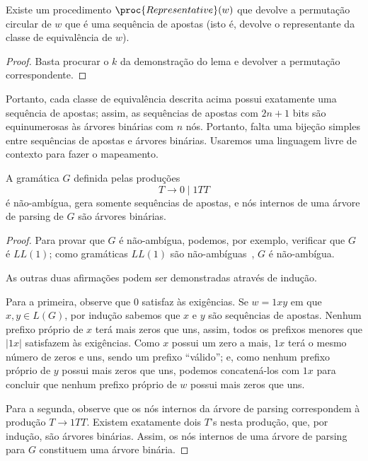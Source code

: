 \begin{corollary}
    Existe um procedimento $\proc{Representative}(w)$
    que devolve a permutação circular de $w$ que é uma sequência de apostas
    (isto é, devolve o representante da classe de equivalência de $w$).
\end{corollary}

\begin{proof}
    Basta procurar o $k$ da demonstração do lema
    e devolver a permutação correspondente.
\end{proof}

Portanto, cada classe de equivalência descrita acima
possui exatamente uma sequência de apostas;
assim, as sequências de apostas com $2n+1$ bits
são equinumerosas às árvores binárias com $n$ nós.
Portanto,
falta uma bijeção simples entre sequências de apostas e árvores binárias.
Usaremos uma linguagem livre de contexto para fazer o mapeamento.

\begin{lemma}
    A gramática $G$ definida pelas produções
    \begin{equation*}
        T \to 0 \mid 1TT
    \end{equation*}
    é não-ambígua, gera somente sequências de apostas,
    e nós internos de uma árvore de parsing de $G$
    são árvores binárias.
\end{lemma}

\begin{proof}
    Para provar que $G$ é não-ambígua,
    podemos, por exemplo, verificar que $G$ é $LL(1)$; %
    como gramáticas $LL(1)$ são não-ambíguas~\cite[p.~233]{AhoLamSethiUllman2006},
    $G$ é não-ambígua.

    As outras duas afirmações podem ser demonstradas através de indução.

    Para a primeira,
    observe que $0$ satisfaz às exigências.
    Se $w = 1xy$ em que $x, y \in L(G)$,
    por indução sabemos que $x$ e $y$ são sequências de apostas.
    Nenhum prefixo próprio de $x$ terá mais zeros que uns,
    assim, todos os prefixos menores que $|1x|$ satisfazem às exigências.
    Como $x$ possui um zero a mais, $1x$ terá o mesmo número de zeros e uns,
    sendo um prefixo ``válido'';
    e, como nenhum prefixo próprio de $y$ possui mais zeros que uns,
    podemos concatená-los com $1x$ para concluir que
    nenhum prefixo próprio de $w$ possui mais zeros que uns.

    Para a segunda,
    observe que os nós internos da árvore de parsing
    correspondem à produção $T \to 1TT$.
    Existem exatamente dois $T$'s nesta produção,
    que, por indução, são árvores binárias.
    Assim, os nós internos de uma árvore de parsing para $G$
    constituem uma árvore binária.
\end{proof}

